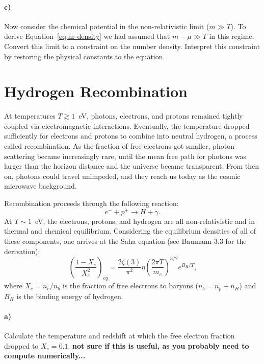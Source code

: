 \documentclass[12pt]{article}
\begin{document}
\paragraph{c)} Now consider the chemical potential in the non-relativistic limit
($m \gg T$). To derive Equation~\ref{eq:nr-density} we had assumed that $m - \mu
\gg T$ in this regime. Convert this limit to a constraint on the number density.
Interpret this constraint by restoring the physical constants to the equation.


\section{Hydrogen Recombination}

At temperatures $T \gtrsim 1$~eV, photons, electrons, and protons remained
tightly coupled via electromagnetic interactions. Eventually, the temperature
dropped sufficiently for electrons and protons to combine into neutral hydrogen,
a process called recombination. As the fraction of free electrons got smaller,
photon scattering became increasingly rare, until the mean free path for photons
was larger than the horizon distance and the universe became transparent. From
then on, photons could travel unimpeded, and they reach us today as the cosmic
microwave background.

Recombination proceeds through the following reaction:
\begin{equation}
    e^- + p^+ \rightarrow H + \gamma \text{.}
\end{equation}
At $T \sim 1$~eV, the electrons, protons, and hydrogen are all non-relativistic
and in thermal and chemical equilibrium. Considering the equilibrium densities
of all of these components, one arrives at the Saha equation (see Baumann 3.3
for the derivation):
\begin{equation}
    \left(\frac{1 - X_e}{X_e^2}\right)_{eq} = \frac{2 \zeta(3)}{\pi^2}
    \eta \left(\frac{2 \pi T}{m_e}\right)^{3/2} e^{B_H/T} \text{,}
\end{equation}
where $X_e = n_e / n_b$ is the fraction of free electrons to baryons ($n_b = n_p
+ n_H$) and $B_H$ is the binding energy of hydrogen.

\paragraph{a)} Calculate the temperature and redshift at which the free electron
fraction dropped to $X_e = 0.1$. \textbf{not sure if this is useful, as you
probably need to compute numerically...}
\end{document}
